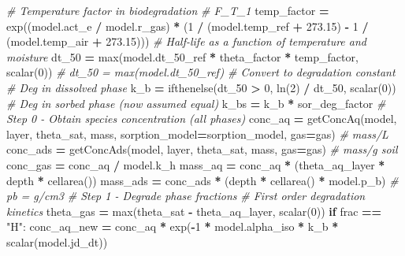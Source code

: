 \documentclass[]{article}
\newenvironment{Shaded}{\begin{snugshade}}{\end{snugshade}}
\newcommand{\DecValTok}[1]{\textcolor[rgb]{0.00,0.00,0.81}{#1}}
\newcommand{\FloatTok}[1]{\textcolor[rgb]{0.00,0.00,0.81}{#1}}
\newcommand{\StringTok}[1]{\textcolor[rgb]{0.31,0.60,0.02}{#1}}
\newcommand{\CommentTok}[1]{\textcolor[rgb]{0.56,0.35,0.01}{\textit{#1}}}
\newcommand{\ControlFlowTok}[1]{\textcolor[rgb]{0.13,0.29,0.53}{\textbf{#1}}}
\newcommand{\OperatorTok}[1]{\textcolor[rgb]{0.81,0.36,0.00}{\textbf{#1}}}
\newcommand{\BuiltInTok}[1]{#1}
\newcommand{\NormalTok}[1]{#1}
\begin{document}
\begin{Shaded}
\begin{Highlighting}[]
    \CommentTok{# Temperature factor in biodegradation}
    \CommentTok{# F_T_1}
\NormalTok{    temp_factor }\OperatorTok{=}\NormalTok{ exp((model.act_e }\OperatorTok{/}\NormalTok{ model.r_gas) }\OperatorTok{*}
\NormalTok{                      (}\DecValTok{1} \OperatorTok{/}\NormalTok{ (model.temp_ref }\OperatorTok{+} \FloatTok{273.15}\NormalTok{) }\OperatorTok{-} \DecValTok{1} \OperatorTok{/}\NormalTok{ (model.temp_air }\OperatorTok{+} \FloatTok{273.15}\NormalTok{)))}
    \CommentTok{# Half-life as a function of temperature and moisture}
\NormalTok{    dt_50 }\OperatorTok{=} \BuiltInTok{max}\NormalTok{(model.dt_50_ref }\OperatorTok{*}\NormalTok{ theta_factor }\OperatorTok{*}\NormalTok{ temp_factor, scalar(}\DecValTok{0}\NormalTok{))}
    \CommentTok{# dt_50 = max(model.dt_50_ref)}
    \CommentTok{# Convert to degradation constant}
    \CommentTok{# Deg in dissolved phase}
\NormalTok{    k_b }\OperatorTok{=}\NormalTok{ ifthenelse(dt_50 }\OperatorTok{>} \DecValTok{0}\NormalTok{, ln(}\DecValTok{2}\NormalTok{) }\OperatorTok{/}\NormalTok{ dt_50,}
\NormalTok{                     scalar(}\DecValTok{0}\NormalTok{))  }
    \CommentTok{# Deg in sorbed phase (now assumed equal)}
\NormalTok{    k_bs }\OperatorTok{=}\NormalTok{ k_b }\OperatorTok{*}\NormalTok{ sor_deg_factor}
    \CommentTok{# Step 0 - Obtain species concentration (all phases)}
\NormalTok{    conc_aq }\OperatorTok{=}\NormalTok{ getConcAq(model, layer, theta_sat, mass,}
\NormalTok{                        sorption_model}\OperatorTok{=}\NormalTok{sorption_model, gas}\OperatorTok{=}\NormalTok{gas)  }\CommentTok{# mass/L}
\NormalTok{    conc_ads }\OperatorTok{=}\NormalTok{ getConcAds(model, layer, theta_sat, mass, gas}\OperatorTok{=}\NormalTok{gas)  }\CommentTok{# mass/g soil}
\NormalTok{    conc_gas }\OperatorTok{=}\NormalTok{ conc_aq }\OperatorTok{/}\NormalTok{ model.k_h}
\NormalTok{    mass_aq }\OperatorTok{=}\NormalTok{ conc_aq }\OperatorTok{*}\NormalTok{ (theta_aq_layer }\OperatorTok{*}\NormalTok{ depth }\OperatorTok{*}\NormalTok{ cellarea())}
\NormalTok{    mass_ads }\OperatorTok{=}\NormalTok{ conc_ads }\OperatorTok{*}\NormalTok{ (depth }\OperatorTok{*}\NormalTok{ cellarea() }\OperatorTok{*}\NormalTok{ model.p_b)  }\CommentTok{# pb = g/cm3}
    \CommentTok{# Step 1 - Degrade phase fractions}
    \CommentTok{# First order degradation kinetics}
\NormalTok{    theta_gas }\OperatorTok{=} \BuiltInTok{max}\NormalTok{(theta_sat }\OperatorTok{-}\NormalTok{ theta_aq_layer, scalar(}\DecValTok{0}\NormalTok{))}
    \ControlFlowTok{if}\NormalTok{ frac }\OperatorTok{==} \StringTok{"H"}\NormalTok{:}
\NormalTok{        conc_aq_new }\OperatorTok{=}\NormalTok{ conc_aq }\OperatorTok{*}\NormalTok{ exp(}\OperatorTok{-}\DecValTok{1} \OperatorTok{*}\NormalTok{ model.alpha_iso }\OperatorTok{*}\NormalTok{ k_b }\OperatorTok{*}\NormalTok{ scalar(model.jd_dt))}

\end{Highlighting}
\end{Shaded}
\end{document}
